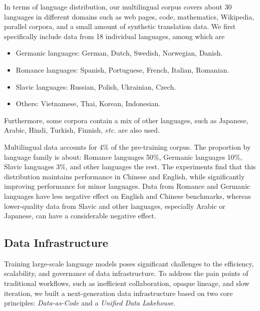 \documentclass[table]{gtech}
\theoremstyle{definition}
\begin{document}
In terms of language distribution, our multilingual corpus covers about 30 languages in different domains such as web pages, code, mathematics, Wikipedia, parallel corpora, and a small amount of synthetic translation data. We first specifically include data from 18 individual languages, among which are
\begin{itemize}
    \item Germanic languages: German, Dutch, Swedish, Norwegian, Danish.
    \item Romance languages: Spanish, Portuguese, French, Italian, Romanian.
    \item Slavic languages: Russian, Polish, Ukrainian, Czech.
    \item Others: Vietnamese, Thai, Korean, Indonesian.
\end{itemize}

Furthermore, some corpora contain a mix of other languages, such as Japanese, Arabic, Hindi, Turkish, Finnish, \emph{etc.} are also used. 

Multilingual data accounts for 4\% of the pre-training corpus. The proportion by language family is about: Romance languages 50\%, Germanic languages 10\%, Slavic languages 3\%, and other languages the rest. The experiments find that this distribution maintains performance in Chinese and English, while significantly improving performance for minor languages. Data from Romance and Germanic languages have less negative effect on English and Chinese benchmarks, whereas lower-quality data from Slavic and other languages, especially Arabic or Japanese, can have a considerable negative effect. 

\subsection{Data Infrastructure}\label{appendix:data:infra}
Training large-scale language models poses significant challenges to the efficiency, scalability, and governance of data infrastructure. To address the pain points of traditional workflows, such as inefficient collaboration, opaque lineage, and slow iteration, we built a next-generation data infrastructure based on two core principles: \emph{Data-as-Code} and a \emph{Unified Data Lakehouse}.
\end{document}
